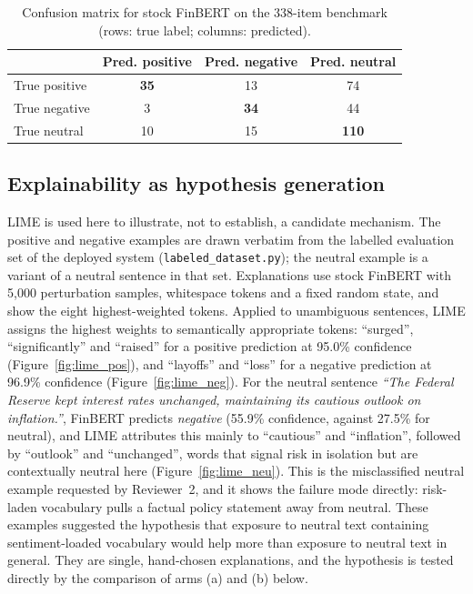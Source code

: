 \documentclass{aims}
\numberwithin{equation}{section}
\begin{document}
\begin{table}[ht]
\centering
\caption{Confusion matrix for stock FinBERT on the 338-item benchmark (rows: true
label; columns: predicted).}
\label{tab:cm}
\begin{tabular}{lccc}
\toprule
 & \textbf{Pred. positive} & \textbf{Pred. negative} & \textbf{Pred. neutral} \\
\midrule
True positive & \textbf{35} & 13 & 74 \\
True negative & 3 & \textbf{34} & 44 \\
True neutral  & 10 & 15 & \textbf{110} \\
\bottomrule
\end{tabular}
\end{table}

\subsection{Explainability as hypothesis generation}
LIME is used here to illustrate, not to establish, a candidate mechanism. The
positive and negative examples are drawn verbatim from the labelled evaluation set
of the deployed system (\texttt{labeled\_dataset.py}); the neutral example is a
variant of a neutral sentence in that set. Explanations use stock FinBERT with
5{,}000 perturbation samples, whitespace tokens and a fixed random state, and show
the eight highest-weighted tokens. Applied to unambiguous sentences, LIME assigns the
highest weights to semantically appropriate tokens: ``surged'',
``significantly'' and ``raised'' for a positive prediction at 95.0\% confidence
(Figure~\ref{fig:lime_pos}), and ``layoffs'' and ``loss'' for a negative prediction
at 96.9\% confidence (Figure~\ref{fig:lime_neg}). For the neutral sentence
\emph{``The Federal Reserve kept interest rates unchanged, maintaining its cautious
outlook on inflation.''}, FinBERT predicts \emph{negative} (55.9\% confidence,
against 27.5\% for neutral), and LIME attributes this mainly to ``cautious'' and
``inflation'', followed by ``outlook'' and ``unchanged'', words that signal risk in
isolation but are contextually neutral here (Figure~\ref{fig:lime_neu}). This is the
misclassified neutral example requested by Reviewer~2, and it shows the failure mode
directly: risk-laden vocabulary pulls a factual policy statement away from neutral.
These examples
suggested the hypothesis that exposure to neutral text containing sentiment-loaded
vocabulary would help more than exposure to neutral text in general. They are
single, hand-chosen explanations, and the hypothesis is tested directly by the
comparison of arms (a) and (b) below.
\end{document}
